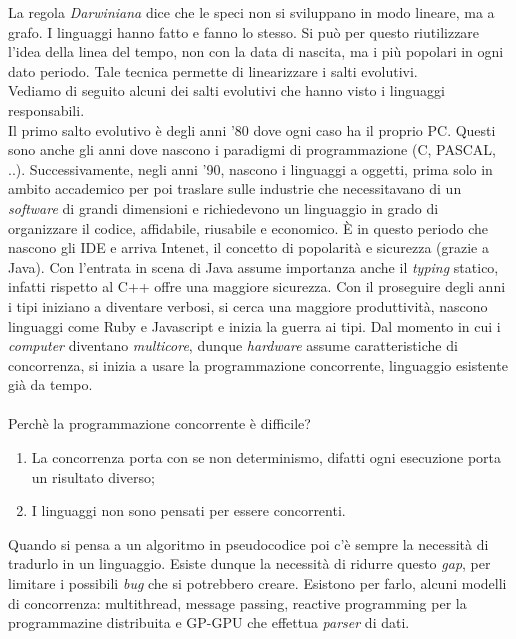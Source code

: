 \documentclass[10pt,a4paper]{book}
\begin{document}
La regola \textit{Darwiniana} dice che le speci non si sviluppano in modo lineare, ma a grafo. I linguaggi hanno fatto e fanno lo stesso. Si pu\`o per questo riutilizzare l'idea della linea del tempo, non con la data di nascita, ma i pi\`u popolari in ogni dato periodo. Tale tecnica permette di linearizzare i salti evolutivi.\\
Vediamo di seguito alcuni dei salti evolutivi che hanno visto i linguaggi responsabili.\\
Il primo salto evolutivo \`e degli anni '80 dove ogni caso ha il proprio PC. Questi sono anche gli anni dove nascono i paradigmi di programmazione (C, PASCAL, ..). Successivamente, negli anni '90, nascono i linguaggi a oggetti, prima solo in ambito accademico per poi traslare sulle industrie che necessitavano di un \textit{software} di grandi dimensioni e richiedevono un linguaggio in grado di organizzare il codice, affidabile, riusabile e economico. \`E in questo periodo che nascono gli IDE e arriva Intenet, il concetto di popolarit\`a e sicurezza (grazie a Java). Con l'entrata in scena di Java assume importanza anche il \textit{typing} statico, infatti rispetto al C++ offre una maggiore sicurezza. Con il proseguire degli anni i tipi iniziano a diventare verbosi, si cerca una maggiore produttivit\`a, nascono linguaggi come Ruby e Javascript e inizia la guerra ai tipi. Dal momento in cui i \textit{computer} diventano \textit{multicore}, dunque \textit{hardware} assume caratteristiche di concorrenza, si inizia a usare la programmazione concorrente, linguaggio esistente gi\`a da tempo.\\\\
Perch\`e la programmazione concorrente \`e difficile?
\begin{enumerate}
\item La concorrenza porta con se non determinismo, difatti ogni esecuzione porta un risultato diverso;
\item I linguaggi non sono pensati per essere concorrenti.
\end{enumerate}
\noindent
Quando si pensa a un algoritmo in pseudocodice poi c'\`e sempre la necessit\`a di tradurlo in un linguaggio. Esiste dunque la necessit\`a di ridurre questo \textit{gap}, per limitare i possibili \textit{bug} che si potrebbero creare. Esistono per farlo, alcuni modelli di concorrenza: multithread, message passing, reactive programming per la programmazine distribuita e GP-GPU che effettua \textit{parser} di dati.\\\\
\end{document}
